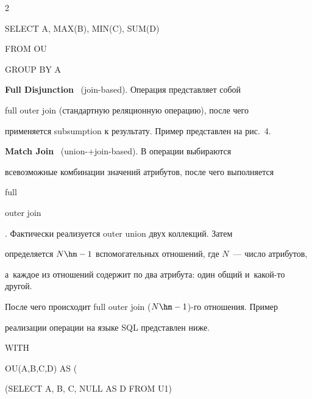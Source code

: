 \begin{multicols}{2}
\noindent

{\sf SELECT A, MAX(B),  MIN(C), SUM(D)}



\noindent

{\sf FROM 	OU}



\noindent

{\sf GROUP BY A}



\smallskip



\textbf{Full Disjunction}~\cite{37-vov} (join-based). Операция представляет собой

{\sf full outer join} (стандартную реляционную операцию), после чего

применяется {\sf subsumption} к результату. Пример представлен на рис.~4.







  \textbf{Match Join}~\cite{11-vov} (union-\;+\;join-based). В операции выбираются

всевозможные комбинации значений атрибутов, после чего выполняется

{\sf full

outer join}. Фактически реализуется {\sf outer union} двух коллекций. Затем

определяется $N\hm-1$ вспомогательных отношений, где $N$~--- число атрибутов,

  а~каж\-дое из отношений содержит по два атрибута: один общий и~какой-то другой.

После чего происходит {\sf full outer join} ($N\hm-1$)-го отношения. Пример

реализации операции на языке SQL представлен ниже.



\smallskip



\noindent

{\sf   WITH}



\noindent

{\sf   \hspace*{3pt}OU(A,B,C,D) AS (}



\noindent

{\sf   \hspace*{3pt}(SELECT A, B, C, NULL AS D FROM U1)}




\end{multicols}
